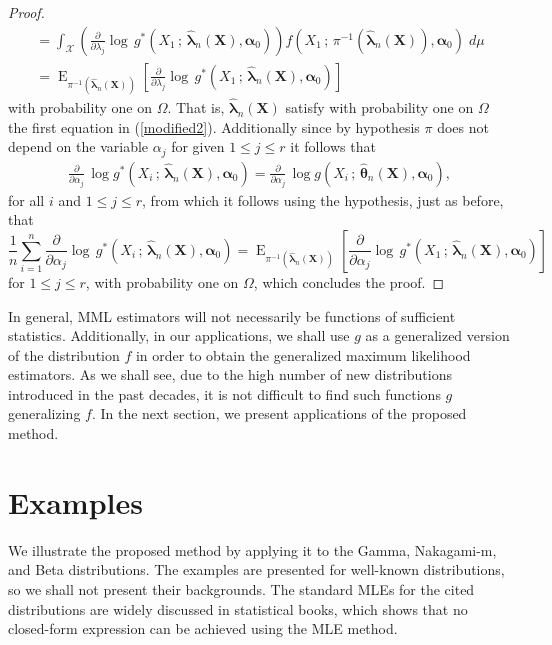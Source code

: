 \documentclass[lineno]{biometrika}
\newcommand{\bs}{\boldsymbol}
\newcommand{\on}{\operatorname}
\begin{document}
\begin{proof}
\begin{equation*}
\begin{aligned}
= \int_{\mathcal{X}}\left(\frac{\partial}{\partial \lambda_j}  \log\, g^*(X_1\,;\, \bs{\hat{\lambda}}_n(\bs{X}),\bs{\alpha}_0)\right)f(X_1\,;\,\pi^{-1}(\bs{\hat{\lambda}}_n(\bs{X})),\bs{\alpha}_0)\; d\mu\\
=\on{E}_{\pi^{-1}(\bs{\hat{\lambda}}_n(\bs{X}))}\left[\frac{\partial}{\partial \lambda_j}  \log\, g^*(X_1\,;\,\bs{\hat{\lambda}}_n(\bs{X}),\bs{\alpha}_0)\right]
\end{aligned}
\end{equation*}
with probability one on $\Omega$. That is, $\bs{\hat{\lambda}}_n(\bs{X})$ satisfy with probability one on $\Omega$ the first equation in (\ref{modified2}).
Additionally since by hypothesis $\pi$ does not depend on the variable $\alpha_j$ for given $1\leq j\leq r$ it follows that
\begin{equation*}
\begin{aligned}
\frac{\partial}{\partial \alpha_j}\, \log g^*(X_i\,;\,\bs{\hat{\lambda}}_n(\bs{X}),\bs{\alpha}_0)  =  \frac{\partial}{\partial \alpha_j}\, \log g(X_i\,;\,\bs{\hat{\theta}}_n(\bs{X}),\bs{\alpha}_0),
\end{aligned}
\end{equation*}
for all $i$ and $1\leq j\leq r$, from which it follows using the hypothesis, just as before, that
\begin{equation*}
\frac{1}{n}
\sum_{i=1}^n \frac{\partial}{\partial \alpha_j}  \log\, g^*(X_i\,;\,\bs{\hat{\lambda}}_n(\bs{X}),\bs{\alpha}_0)=\on{E}_{\pi^{-1}(\bs{\hat{\lambda}}_n(\bs{X}))}\left[\frac{\partial}{\partial \alpha_j}  \log\, g^*(X_1\,;\,\bs{\hat{\lambda}}_n(\bs{X}),\bs{\alpha}_0)\right]
\end{equation*}
for $1\leq j\leq r$, with probability one on $\Omega$, which concludes the proof.
\end{proof}
In general, MML estimators will not necessarily be functions of sufficient statistics. Additionally, in our applications, we shall use $g$ as a generalized version of the distribution $f$ in order to obtain the generalized maximum likelihood estimators. As we shall see, due to the high number of new distributions introduced in the past decades, it is not difficult to find such functions $g$ generalizing $f$. In the next section, we present applications of the proposed method.


\section{Examples}


We illustrate the proposed method by applying it to the Gamma, Nakagami-m, and Beta distributions. The examples are presented for well-known distributions, so we shall not present their backgrounds. The standard MLEs for the cited distributions are widely discussed in statistical books, which shows that no closed-form expression can be achieved using the MLE method.
\end{document}
